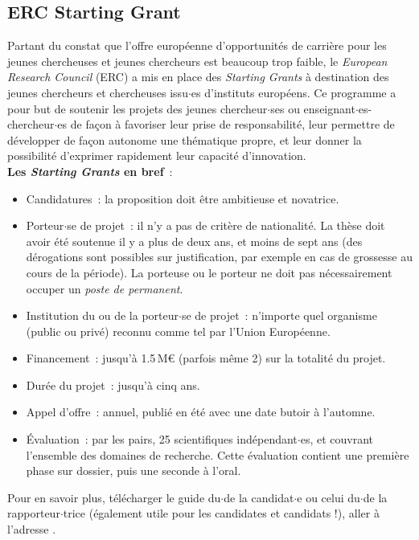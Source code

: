\subsection{ERC Starting Grant}

Partant du constat que l'offre europ\'eenne d'opportunit\'es de carri\`ere pour les jeunes chercheuses et jeunes chercheurs est
 beaucoup trop faible, le \textit{European Research Council} (ERC) a mis en place 
 des \textit{Starting Grants}
\`a destination des jeunes chercheurs et chercheuses issu$\cdot$es d'instituts europ\'eens. Ce programme a pour but de soutenir
 les projets des jeunes chercheur$\cdot$ses ou enseignant$\cdot$es-chercheur$\cdot$es de fa\c con \`a favoriser leur prise de
responsabilit\'e, leur permettre de d\'evelopper de fa\c con autonome une th\'ematique propre, 
et leur donner la possibilit\'e d'exprimer rapidement leur capacit\'e d'innovation. \\

\textbf{Les \textit{Starting Grants} en bref}~:
\begin{itemize}
\item Candidatures~: la proposition doit \^etre ambitieuse et novatrice.
\item Porteur$\cdot$se de projet~: il n'y a pas de crit\`ere de nationalit\'e. La th\`ese doit avoir \'et\'e soutenue il y a plus de deux ans, et moins de sept ans (des d\'erogations sont possibles sur justification, par exemple en cas de grossesse au cours de la p\'eriode). La porteuse ou le porteur ne doit pas n{\'e}cessairement occuper un \textit{poste de permanent}.
\item Institution du ou de la porteur$\cdot$se de projet~: n'importe quel organisme (public ou priv\'e) reconnu comme tel par l'Union Europ\'eenne.
\item Financement~: jusqu'\`a 1.5\,M\euro{} (parfois m\^eme 2) sur la totalit\'e du projet.
\item Dur\'ee du projet~: jusqu'\`a cinq ans.
\item Appel d'offre~: annuel, publi\'e en \'et\'e avec une date butoir \`a l'automne.
\item \'Evaluation~: par les pairs, 25 scientifiques ind\'ependant$\cdot$es, et couvrant l'ensemble des domaines de recherche. Cette {\'e}valuation contient une premi{\`e}re phase sur dossier, puis une seconde {\`a} l'oral.
\end{itemize}
Pour en savoir plus, t\'el\'echarger le guide du$\cdot$de la candidat$\cdot$e ou celui du$\cdot$de la rapporteur$\cdot$trice (\'egalement utile pour les candidates et candidats !), aller \`a l'adresse 
.


